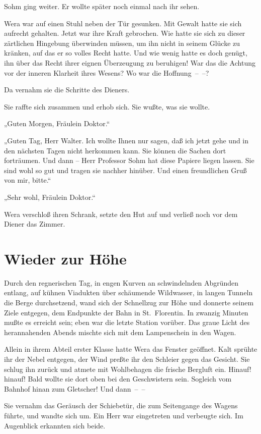 Sohm ging weiter. Er wollte später noch einmal nach ihr sehen.

Wera war auf einen Stuhl neben der Tür gesunken. Mit Gewalt hatte
sie sich aufrecht gehalten. Jetzt war ihre Kraft gebrochen. Wie
hatte sie sich zu dieser zärtlichen Hingebung überwinden müssen, um
ihn nicht in seinem Glücke zu kränken, auf das er so volles Recht
hatte. Und wie wenig hatte es doch genügt, ihn über das Recht ihrer
eignen Überzeugung zu beruhigen! War das die Achtung vor der
inneren Klarheit ihres Wesens? Wo war die Hoffnung~–~–?

Da vernahm sie die Schritte des Dieners.

Sie raffte sich zusammen und erhob sich. Sie wußte, was sie
wollte.

„Guten Morgen, Fräulein Doktor.“

„Guten Tag, Herr Walter. Ich wollte Ihnen nur sagen, daß ich jetzt
gehe und in den nächsten Tagen nicht herkommen kann. Sie können die
Sachen dort forträumen. Und dann – Herr Professor Sohm hat diese
Papiere liegen lassen. Sie sind wohl so gut und tragen sie nachher
hinüber. Und einen freundlichen Gruß von mir, bitte.“

„Sehr wohl, Fräulein Doktor.“

Wera verschloß ihren Schrank, setzte den Hut auf und verließ noch
vor dem Diener das Zimmer.

\section{Wieder zur Höhe}

Durch den regnerischen Tag, in engen Kurven an schwindelnden
Abgründen entlang, auf kühnen Viadukten über schäumende Wildwasser,
in langen Tunneln die Berge durchsetzend, wand sich der Schnellzug
zur Höhe und donnerte seinem Ziele entgegen, dem Endpunkte der Bahn
in St.~Florentin. In zwanzig Minuten mußte es erreicht sein; eben
war die letzte Station vorüber. Das graue Licht des herannahenden
Abends mischte sich mit dem Lampenschein in den Wagen.

Allein in ihrem Abteil erster Klasse hatte Wera das Fenster
geöffnet. Kalt sprühte ihr der Nebel entgegen, der Wind preßte ihr
den Schleier gegen das Gesicht. Sie schlug ihn zurück und atmete
mit Wohlbehagen die frische Bergluft ein. Hinauf! hinauf! Bald
wollte sie dort oben bei den Geschwistern sein. Sogleich vom
Bahnhof hinan zum Gletscher! Und dann~–~–

Sie vernahm das Geräusch der Schiebetür, die zum Seitengange des
Wagens führte, und wandte sich um. Ein Herr war eingetreten und
verbeugte sich. Im Augenblick erkannten sich beide.

